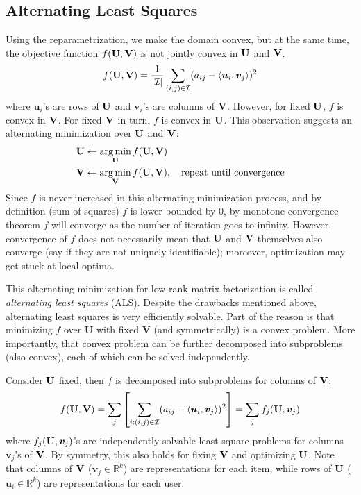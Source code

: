 \documentclass[../book-template.tex]{subfiles}
\begin{document}
\subsection{Alternating Least Squares}
Using the reparametrization, we make the domain convex, but at the same time, the objective function $f({\bf U}, {\bf V})$ is not jointly convex in ${\bf U}$ and ${\bf V}$. 
\begin{equation*}
	f({\bf U}, {\bf V})=\frac{1}{|\mathcal{I}|}\sum_{(i,j)\in \mathcal{I}}(a_{ij}-\langle\bm{u}_i,\bm{v}_j\rangle)^2
\end{equation*}
where $\bm{u}_i$'s are rows of ${\bf U}$ and $\bm{v}_i$'s are columns of ${\bf V}$. However, for fixed ${\bf U}$, $f$ is convex in ${\bf V}$. For fixed ${\bf V}$ in turn, $f$ is convex in ${\bf U}$. This observation suggests an alternating minimization over ${\bf U}$ and ${\bf V}$:
\begin{align*}
	&{\bf U}\leftarrow \mathop{\arg\min}_{{\bf U}} f({\bf U}, {\bf V})\\
	&{\bf V}\leftarrow \mathop{\arg\min}_{{\bf V}} f({\bf U}, {\bf V}),\quad \text{repeat until convergence}
\end{align*}
Since $f$ is never increased in this alternating minimization process, and by definition (sum of squares) $f$ is lower bounded by $0$, by monotone convergence theorem $f$ will converge as the number of iteration goes to infinity. However, convergence of $f$ does not necessarily mean that ${\bf U}$ and ${\bf V}$ themselves also converge (say if they are not uniquely identifiable); moreover, optimization may get stuck at local optima.
\par This alternating minimization for low-rank matrix factorization is called \emph{alternating least squares} (ALS). Despite the drawbacks mentioned above, alternating least squares is very efficiently solvable. 
Part of the reason is that minimizing $f$ over $\bm{U}$ with fixed $\bm{V}$ (and symmetrically) is a convex problem.
More importantly, that convex problem can be further decomposed into subproblems (also convex), each of which can be solved independently. 
\par Consider ${\bf U}$ fixed, then $f$ is decomposed into subproblems for columns of ${\bf V}$:
\begin{equation*}
		f({\bf U}, {\bf V})= \sum_{j}\left[\sum_{i:(i,j)\in \mathcal{I}} (a_{ij} - \langle \bm{u}_i,\bm{v}_j \rangle)^2\right] = \sum_{j} f_j({\bf U}, \bm{v}_j)
\end{equation*}
where $f_j({\bf U}, \bm{v}_j)$'s are independently solvable least square problems for columns $\bm{v}_j$'s of ${\bf V}$. By symmetry, this also holds for fixing ${\bf V}$ and optimizing ${\bf U}$. Note that columns of ${\bf V}$ ($\bm{v}_j \in \mathbb{R}^k$) are representations for each item, while rows of ${\bf U}$ ($\bm{u}_i \in \mathbb{R}^k$) are representations for each user. 
\end{document}
